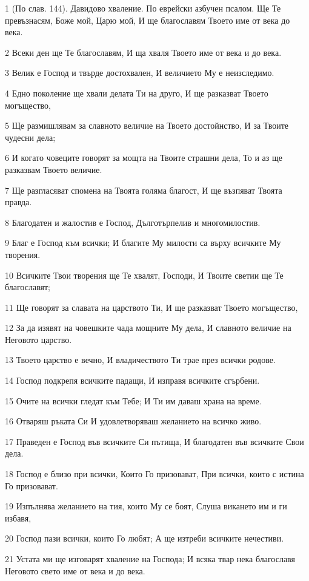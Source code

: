 \par 1 (По слав. 144). Давидово хваление. По еврейски азбучен псалом. Ще Те превъзнасям, Боже мой, Царю мой, И ще благославям Твоето име от века до века.
\par 2 Всеки ден ще Те благославям, И ща хваля Твоето име от века и до века.
\par 3 Велик е Господ и твърде достохвален, И величието Му е неизследимо.
\par 4 Едно поколение ще хвали делата Ти на друго, И ще разказват Твоето могъщество,
\par 5 Ще размишлявам за славното величие на Твоето достойнство, И за Твоите чудесни дела;
\par 6 И когато човеците говорят за мощта на Твоите страшни дела, То и аз ще разказвам Твоето величие.
\par 7 Ще разгласяват спомена на Твоята голяма благост, И ще възпяват Твоята правда.
\par 8 Благодатен и жалостив е Господ, Дълготърпелив и многомилостив.
\par 9 Благ е Господ към всички; И благите Му милости са върху всичките Му творения.
\par 10 Всичките Твои творения ще Те хвалят, Господи, И Твоите светии ще Те благославят;
\par 11 Ще говорят за славата на царството Ти, И ще разказват Твоето могъщество,
\par 12 За да изявят на човешките чада мощните Му дела, И славното величие на Неговото царство.
\par 13 Твоето царство е вечно, И владичеството Ти трае през всички родове.
\par 14 Господ подкрепя всичките падащи, И изправя всичките сгърбени.
\par 15 Очите на всички гледат към Тебе; И Ти им даваш храна на време.
\par 16 Отваряш ръката Си И удовлетворяваш желанието на всичко живо.
\par 17 Праведен е Господ във всичките Си пътища, И благодатен във всичките Свои дела.
\par 18 Господ е близо при всички, Които Го призовават, При всички, които с истина Го призовават.
\par 19 Изпълнява желанието на тия, които Му се боят, Слуша викането им и ги избавя,
\par 20 Господ пази всички, които Го любят; А ще изтреби всичките нечестиви.
\par 21 Устата ми ще изговарят хваление на Господа; И всяка твар нека благославя Неговото свето име от века и до века.

